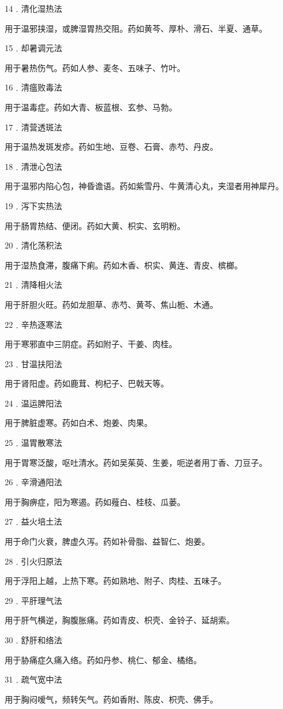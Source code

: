 \documentclass[12pt,UTF8]{ctexbook}
\begin{document}
14﹒清化湿热法

用于温邪挟湿，或脾湿胃热交阻。药如黄芩、厚朴、滑石、半夏、通草。

15﹒却暑调元法

用于暑热伤气。药如人参、麦冬、五味子、竹叶。

16﹒清瘟败毒法

用于温毒症。药如大青、板蓝根、玄参、马勃。

17﹒清营透斑法

用于温热发斑发疹。药如生地、豆卷、石膏、赤芍、丹皮。

18﹒清泄心包法

用于温邪内陷心包，神昏谵语。药如紫雪丹、牛黄清心丸，夹湿者用神犀丹。

19﹒泻下实热法

用于肠胃热结、便闭。药如大黄、枳实、玄明粉。

20﹒清化荡积法

用于湿热食滞，腹痛下痢。药如木香、枳实、黄连、青皮、槟榔。

21﹒清降相火法

用于肝胆火旺。药如龙胆草、赤芍、黄芩、焦山栀、木通。

22﹒辛热逐寒法

用于寒邪直中三阴症。药如附子、干姜、肉桂。

23﹒甘温扶阳法

用于肾阳虚。药如鹿茸、枸杞子、巴戟天等。

24﹒温运脾阳法

用于脾脏虚寒。药如白术、炮姜、肉果。

25﹒温胃散寒法

用于胃寒泛酸，呕吐清水。药如吴茱萸、生姜，呃逆者用丁香、刀豆子。

26﹒辛滑通阳法

用于胸痹症，阳为寒遏。药如薤白、桂枝、瓜蒌。

27﹒益火培土法

用于命门火衰，脾虚久泻。药如补骨脂、益智仁、炮姜。

28﹒引火归原法

用于浮阳上越，上热下寒。药如熟地、附子、肉桂、五味子。

29﹒平肝理气法

用于肝气横逆，胸腹胀痛。药如青皮、枳壳、金铃子、延胡索。

30﹒舒肝和络法

用于胁痛症久痛入络。药如丹参、桃仁、郁金、橘络。

31﹒疏气宽中法

用于胸闷嗳气，频转矢气。药如香附、陈皮、枳壳、佛手。
\end{document}
